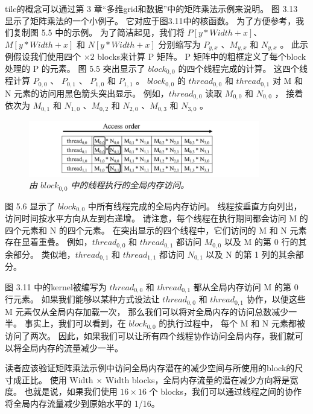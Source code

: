 tile的概念可以通过第 3 章“多维grid和数据”中的矩阵乘法示例来说明。 图 3.13 显示了矩阵乘法的一个小例子。 
它对应于图3.11中的核函数。 为了方便参考，我们复制图 5.5 中的示例。 
为了简洁起见，我们将 $P[y * Width+x]$、$M[y * Width+x]$ 和 $N[y * Width+x]$ 
分别缩写为 $P_{y,x}$ 、$M_{y, x}$ 和 $N_{y,x}$ 。 
此示例假设我们使用四个 $\times 2$ blocks来计算 P 矩阵。 P 矩阵中的粗框定义了每个block处理的 P 的元素。 
图 5.5 突出显示了 $block_{0,0}$ 的四个线程完成的计算。 
这四个线程计算 $P_{0,0}$ 、 $P_{0,1}$ 、 $P_{1,0}$ 和 $P_{1,1}$ 。 
$block_{0,0}$ 的 $thread_{0,0}$ 和 $thread_{0,1}$ 对 M 和 N 元素的访问用黑色箭头突出显示。 
例如，$thread_{0,0}$ 读取 $M_{0,0}$ 和 $N_{0,0}$ ，
接着依次为 $M_{0,1}$ 和 $N_{1,0}$ 、$M_{0,2}$ 和 $N_{2,0}$ 、$M_{0,3}$ 和 $N_{3,0}$ 。

\begin{figure}[H]
	\centering
	\includegraphics[width=0.9\textwidth]{figs/F5.6.png}
	\caption{\textit{由 $block_{0,0}$ 中的线程执行的全局内存访问。}}
\end{figure}

图 5.6 显示了 $block_{0,0}$ 中所有线程完成的全局内存访问。 线程按垂直方向列出，访问时间按水平方向从左到右递增。 
请注意，每个线程在执行期间都会访问 M 的四个元素和 N 的四个元素。 
在突出显示的四个线程中，它们访问的 M 和 N 元素存在显着重叠。 
例如，$thread_{0,0}$ 和 $thread_{0,1}$ 都访问 $M_{0,0}$ 以及 M 的第 0 行的其余部分。
类似地，$thread_{0,1}$ 和 $thread_{1,1}$ 都访问 $N_{0,1}$ 以及 N 的第 1 列的其余部分。

图 3.11 中的kernel被编写为 $thread_{0,0}$ 和 $thread_{0,1}$ 都从全局内存访问 M 的第 0 行元素。 
如果我们能够以某种方式设法让 $thread_{0,0}$ 和 $thread_{0,1}$ 协作，以便这些 M 元素仅从全局内存加载一次，
那么我们可以将对全局内存的访问总数减少一半。 事实上，我们可以看到，在 $block_{0,0}$ 的执行过程中，
每个 M 和 N 元素都被访问了两次。 因此，如果我们可以让所有四个线程协作访问全局内存，我们就可以将全局内存的流量减少一半。

读者应该验证矩阵乘法示例中访问全局内存潜在的减少空间与所使用的block的尺寸成正比。 
使用 Width $\times$ Width blocks，全局内存流量的潜在减少方向将是宽度。 
也就是说，如果我们使用 $16 \times 16$ 个 blocks，我们可以通过线程之间的协作将全局内存流量减少到原始水平的 1/16。

